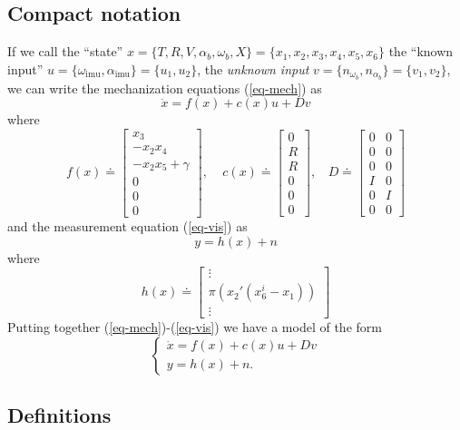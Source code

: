 \documentclass[]{article}
\newcommand{\ba}{\left[ \begin{array}}
\newcommand{\ea}{\end{array} \right]}
\def\w{\omega}
\def\imu{_\mathrm{imu}}
\begin{document}
\subsection{Compact notation}
If we call the ``state'' $x = \{T, R, V, \alpha_b, \w_b, X\} = \{x_1, x_2, x_3, x_4, x_5, x_6\}$ the ``known input'' $u = \{\w\imu , \alpha\imu \} = \{u_1, u_2\}$, the {\em unknown input} $v = \{ n_{\w_b}, n_{\alpha_b} \} = \{v_1, v_2\}$, we can write the mechanization equations (\ref{eq-mech}) as
\begin{equation}
\dot x = f(x) + c(x) u + D v
\label{eq-mod0}
\end{equation}
where 
\begin{equation}
f(x) \doteq \ba{c} x_3 \\ -x_2 x_4 \\ -x_2 x_5 + \gamma \\ 0 \\0 \\ 0 \ea, ~~~~~ c(x) \doteq \ba{c} 0 \\ R \\ R \\ 0 \\ 0 \\ 0\ea, ~~~~ D \doteq \ba{cc} 0 & 0\\ 0 & 0  \\ 0 & 0 \\ I & 0 \\ 0 & I \\ 0 & 0\ea
\end{equation}
and the measurement equation (\ref{eq-vis}) as
\begin{equation}
y = h(x)+n
\end{equation}
where
\begin{equation}
h(x) \doteq \ba{c} \vdots \\ \pi(x_2'(x_6^i - x_1)) \\ \vdots \ea
\end{equation}
Putting together (\ref{eq-mech})-(\ref{eq-vis}) we have a model of the form
\begin{equation}
\boxed{\begin{cases}
\dot x = f(x) + c(x) u + D v \\
y = h(x) + n.
\end{cases}}
\label{eq-fg}
\end{equation}

\subsection{Definitions}
\end{document}
